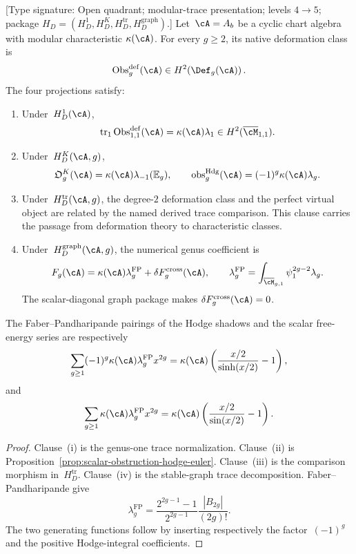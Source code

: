 \begin{theorem}
\label{thm:genus-universality}
\textup{[Type signature: Open quadrant; modular-trace presentation;
levels $4\to5$; package
$H_D=(H_D^1,H_D^K,H_D^{\mathrm{tr}},H_D^{\mathrm{graph}})$.]}
Let~$\cA=A_b$ be a cyclic chart algebra with modular characteristic
$\kappa(\cA)$.  For every $g\geq2$, its native deformation class is
\[
 \operatorname{Obs}^{\mathrm{def}}_g(\cA)
 \in H^2\!\left(\Def_g(\cA)\right).
\]
The four projections satisfy:
\begin{enumerate}[label=\textup{(\roman*)}]
\item Under~$H_D^1(\cA)$,
\[
 \operatorname{tr}_1\operatorname{Obs}^{\mathrm{def}}_{1,1}(\cA)
 =\kappa(\cA)\lambda_1
 \in H^2(\overline{\cM}_{1,1}).
\]
\item Under~$H_D^K(\cA,g)$,
\begin{equation}
 \mathfrak O_g^K(\cA)
 =\kappa(\cA)\lambda_{-1}(\mathbb E_g),
 \qquad
 \operatorname{obs}^{\mathrm{Hdg}}_g(\cA)
 =(-1)^g\kappa(\cA)\lambda_g.
 \label{eq:genus-universality}
\end{equation}
\item Under~$H_D^{\mathrm{tr}}(\cA,g)$, the degree-$2$ deformation
class and the perfect virtual object are related by the named derived
trace comparison.  This clause carries the passage from deformation
theory to characteristic classes.
\item Under~$H_D^{\mathrm{graph}}(\cA,g)$, the numerical genus
coefficient is
\[
 F_g(\cA)
 =\kappa(\cA)\lambda_g^{\mathrm{FP}}
 +\delta F_g^{\mathrm{cross}}(\cA),
 \qquad
 \lambda_g^{\mathrm{FP}}
 =\int_{\overline{\cM}_{g,1}}\psi_1^{2g-2}\lambda_g.
\]
The scalar-diagonal graph package makes
$\delta F_g^{\mathrm{cross}}(\cA)=0$.
\end{enumerate}
The Faber--Pandharipande pairings of the Hodge shadows and the scalar
free-energy series are
respectively
\[
 \sum_{g\ge1}(-1)^g\kappa(\cA)\lambda_g^{\mathrm{FP}}x^{2g}
 =\kappa(\cA)\left(\frac{x/2}{\sinh(x/2)}-1\right),
\]
and
\[
 \sum_{g\ge1}\kappa(\cA)\lambda_g^{\mathrm{FP}}x^{2g}
 =\kappa(\cA)\left(\frac{x/2}{\sin(x/2)}-1\right).
\]
\end{theorem}

\begin{proof}
Clause~(i) is the genus-one trace normalization.  Clause~(ii) is
Proposition~\ref{prop:scalar-obstruction-hodge-euler}.  Clause~(iii)
is the comparison morphism in~$H_D^{\mathrm{tr}}$.  Clause~(iv) is
the stable-graph trace decomposition.  Faber--Pandharipande
\cite{FP03} give
\[
 \lambda_g^{\mathrm{FP}}
 =\frac{2^{2g-1}-1}{2^{2g-1}}
 \frac{|B_{2g}|}{(2g)!}.
\]
The two generating functions follow by inserting respectively the
factor~$(-1)^g$ and the positive Hodge-integral coefficients.
\end{proof}

